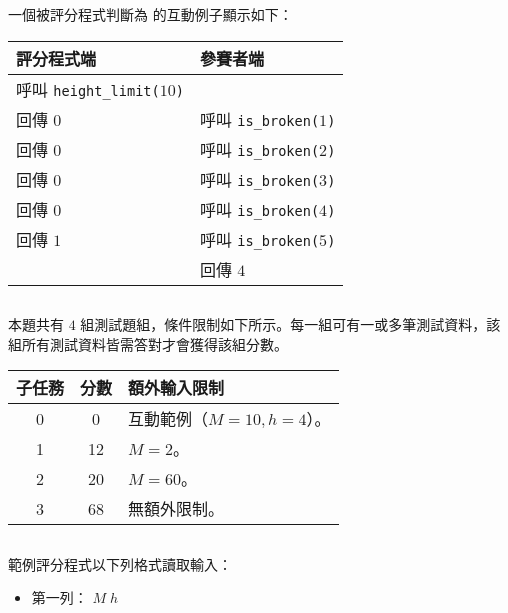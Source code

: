 一個被評分程式判斷為  的互動例子顯示如下：

\begin{center}
    \begin{tabular}[t]{@{}ll@{}}
    \toprule
    評分程式端 & 參賽者端\\
    \midrule
    呼叫 \texttt{height\_limit($10$)} & \\
    回傳 $0$ & 呼叫 \texttt{is\_broken($1$)}\\
    回傳 $0$ & 呼叫 \texttt{is\_broken($2$)}\\
    回傳 $0$ & 呼叫 \texttt{is\_broken($3$)}\\
    回傳 $0$ & 呼叫 \texttt{is\_broken($4$)}\\
    回傳 $1$ & 呼叫 \texttt{is\_broken($5$)}\\
    & 回傳 $4$\\
    \bottomrule
    \end{tabular}
\end{center}

\subsection*{}

本題共有 $4$ 組測試題組，條件限制如下所示。每一組可有一或多筆測試資料，該組所有測試資料皆需答對才會獲得該組分數。

\begin{center}
    \begin{tabular}[t]{@{}ccl@{}}
    \toprule
    子任務 & 分數 & 額外輸入限制\\
    \midrule
    0 & 0  & 互動範例（$M=10, h=4$）。\\
    1 & 12 & $M=2$。\\
    2 & 20 & $M=60$。\\
    3 & 68 & 無額外限制。\\
    \bottomrule
    \end{tabular}
\end{center}

\newpage

\subsection*{}

範例評分程式以下列格式讀取輸入：

\begin{itemize}
    \item 第一列： $M\;h$
\end{itemize}

